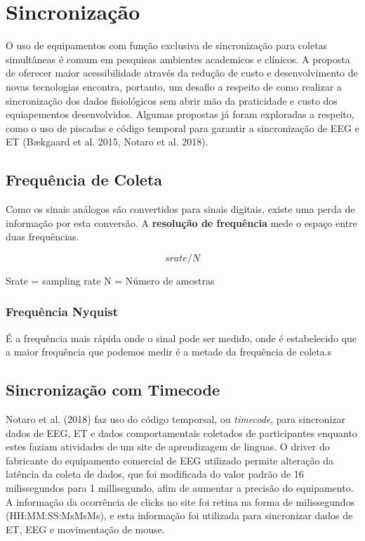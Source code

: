 \chapter{Sincronização}

O uso de equipamentos com função exclusiva de sincronização para coletas simultâneas é comum em pesquisas ambientes academicos e clínicos.
A proposta de oferecer maior acessibilidade através da redução de custo e desenvolvimento de novas tecnologias encontra, portanto, um desafio a respeito 
de como realizar a sincronização dos dados fisiológicos sem abrir mão da praticidade e custo dos equiapementos desenvolvidos. 
Algumas propostas já foram exploradas a respeito, como o uso de piscadas e código temporal para garantir a sincronização de EEG e ET (Bækgaard et al. 2015, Notaro et al. 2018).

\section{Frequência de Coleta}
Como os sinais análogos são convertidos para sinais digitais, existe uma perda de informação por esta conversão. 
A \textbf{resolução de frequência} mede o espaço entre duas frequências. 

$$srate/N$$

Srate = sampling rate 
N = Número de amostras

\subsection{Frequência Nyquist}
É a frequência mais rápida onde o sinal pode ser medido, onde é estabelecido que a maior frequência que podemos medir é a metade 
da frequência de coleta.s


\section{Sincronização com Timecode}
Notaro et al. (2018) faz uso do código temporsal, ou \textit{timecode}, para sincronizar dados de EEG, ET e dados comportamentais 
coletados de participantes enquanto estes faziam atividades de um site de aprendizagem de linguas. O driver
do fabricante do equipamento comercial de EEG utilizado permite alteração da latência da coleta de dados, que
foi modificada do valor padrão de 16 milissegundos para 1 millisegundo, afim de aumentar a precisão do equipamento.
A informação da ocorrência de clicks no site foi retina na forma de milissegundos (HH:MM:SS:MsMsMs), e esta informação foi utilizada 
para sincronizar dados de ET, EEG e movimentação de mouse. 

